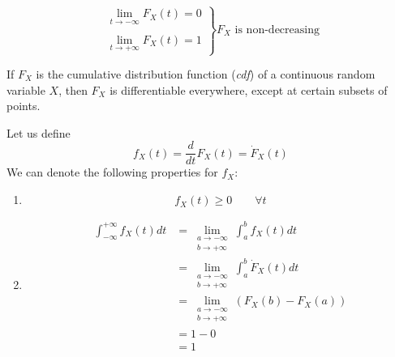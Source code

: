 \documentclass{article}
\begin{document}
\begin{defn}
		\begin{figure}[h]
			\begin{subfigure}{0.45\textwidth}
				\begin{center}
				\end{center}
				
			\end{subfigure}
			\hfill
			\begin{subfigure}{0.45\textwidth}
				$$ 
					\left.
					\begin{array}{c}
						\lim\limits_{t \to - \infty} F_X (t) = 0 \\
						\\
						\lim\limits_{t \to + \infty} F_X (t) = 1 
					\end{array}
					\right\}
					F_X \text{ is non-decreasing}
				$$
			\end{subfigure}
		\end{figure}
	\end{defn}
	\begin{prop}
		If $F_X$ is the cumulative distribution function (\emph{cdf}) of a continuous random variable $X$, then $F_X$ is differentiable everywhere, except at certain subsets of points.
	\end{prop}
	Let us define
	$$ 
		f_X (t) = \frac{d}{dt} F_X (t) = \dot{F}_X (t)
	$$
	We can denote the following properties for $f_X$:
	\begin{enumerate}
		\item$$f_X (t) \geq 0 \quad \quad \forall t$$
		\item \begin{align*}
			\int_{-\infty}^{+\infty} f_X (t) dt &= \lim_{\substack{a \to - \infty \\  b \to + \infty}} \int_a^b f_X (t)dt \\
			&= \lim_{\substack{a \to - \infty \\  b \to + \infty}} \int_a^b \dot{F}_X (t)dt \\
			&= \lim_{\substack{a \to - \infty \\  b \to + \infty}} \left( F_X (b) -  F_X (a) \right) \\
			&= 1-0 \\
			&= 1
		\end{align*}
	\end{enumerate}
\pagebreak
\end{document}
